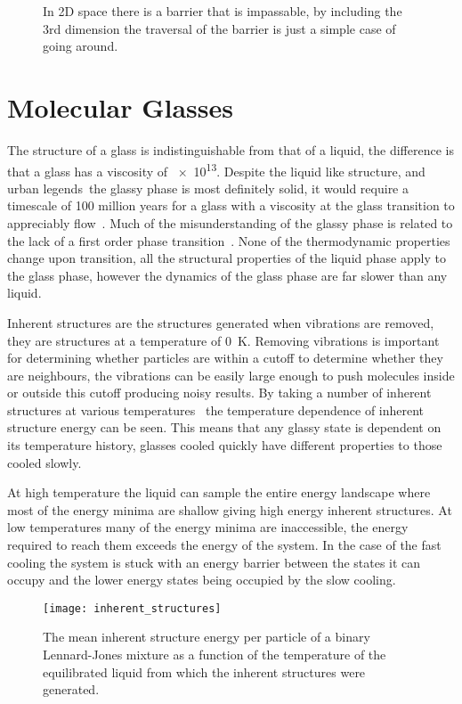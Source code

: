 \begin{figure}
    \centering
    \caption{In 2D space there is a barrier that is impassable, by including the 3rd dimension the traversal of the barrier is just a simple case of going around.}
    \label{fig:barrier dimensions}
\end{figure}

\section{Molecular Glasses}
\label{sec:molecular glasses}

The structure of a glass is indistinguishable from that of a liquid, the difference is that a glass has a viscosity of \SI{e13}{\poise}. Despite the liquid like structure, and urban legends~\tocite the glassy phase is most definitely solid, it would require a timescale of 100 million years for a glass with a viscosity at the glass transition to appreciably flow~\tocite. Much of the misunderstanding of the glassy phase is related to the lack of a first order phase transition~\tocite. None of the thermodynamic properties change upon transition, all the structural properties of the liquid phase apply to the glass phase, however the dynamics of the glass phase are far slower than any liquid.

Inherent structures are the structures generated when vibrations are removed, they are structures at a temperature of \SI{0}{\kelvin}. Removing vibrations is important for determining whether particles are within a cutoff to determine whether they are neighbours, the vibrations can be easily large enough to push molecules inside or outside this cutoff producing noisy results. By taking a number of inherent structures at various temperatures~ the temperature dependence of inherent structure energy can be seen. This means that any glassy state is dependent on its temperature history, glasses cooled quickly have different properties to those cooled slowly.

At high temperature the liquid can sample the entire energy landscape where most of the energy minima are shallow giving high energy inherent structures. At low temperatures many of the energy minima are inaccessible, the energy required to reach them exceeds the energy of the system. In the case of the fast cooling the system is stuck with an energy barrier between the states it can occupy and the lower energy states being occupied by the slow cooling.

\begin{figure}
    \centering
    \texttt{[image: inherent\_structures]}
    \caption[The mean inherent structure energy as a function of temperature]{The mean inherent structure energy per particle of a binary Lennard-Jones mixture as a function of the temperature of the equilibrated liquid from which the inherent structures were generated.}
    \label{fig:inherent structures}
\end{figure}


